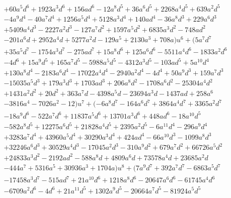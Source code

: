 \documentclass{gtpart}
\theoremstyle{definition}
\theoremstyle{remark}
\begin{document}
\begin{equation*}
\begin{split}
\qquad& + 60 a^5 d^6 + 1923 a^3 d^6 + 156 a d^6 - 12 a^8 d^5 + 36 a^6 d^5 + 2268 a^4 d^5 + 639 a^2 d^5 \\
      & - 4 a^9 d^4 - 40 a^7 d^4 + 1256 a^5 d^4 + 5128 a^3 d^4 + 140 a d^4 - 36 a^8 d^3 + 229 a^6 d^3 \\
      & + 5409 a^4 d^3 - 2227 a^2 d^3 - 127 a^7 d^2 + 1597 a^5 d^2 + 6835 a^3 d^2 - 748 a d^2 \\
      & - 201 a^6 d + 2952 a^4 d + 5277 a^2 d - 129 a^5 + 2130 a^3 + 708 a) u^6 + (5 a^7 d^7 \\
      & + 35 a^5 d^7 - 1754 a^3 d^7 - 275 a d^7 + 15 a^8 d^6 + 125 a^6 d^6 - 5511 a^4 d^6 - 1833 a^2 d^6 \\
      & - 4 d^6 + 15 a^9 d^5 + 165 a^7 d^5 - 5988 a^5 d^5 - 4312 a^3 d^5 - 103 a d^5 + 5 a^{10} d^4 \\
      & + 130 a^8 d^4 - 2183 a^6 d^4 - 17022 a^4 d^4 - 2940 a^2 d^4 - 4 d^4 + 50 a^9 d^3 + 159 a^7 d^3 \\
      & - 15035 a^5 d^3 + 179 a^3 d^3 + 1703 a d^3 + 206 a^8 d^2 - 1708 a^6 d^2 - 25304 a^4 d^2 \\
      & + 1431 a^2 d^2 + 20 d^2 + 363 a^7 d - 4398 a^5 d - 23694 a^3 d - 1437 a d + 258 a^6 \\
      & - 3816 a^4 - 7026 a^2 - 12) u^7 + (-6 a^8 d^7 - 164 a^6 d^7 + 3864 a^4 d^7 + 3365 a^2 d^7 \\
      & - 18 a^9 d^6 - 522 a^7 d^6 + 11837 a^5 d^6 + 13701 a^3 d^6 + 448 a d^6 - 18 a^{10} d^5 \\
      & - 582 a^8 d^5 + 12275 a^6 d^5 + 21828 a^4 d^5 + 2395 a^2 d^5 - 6 a^{11} d^4 - 296 a^9 d^4 \\
      & + 3283 a^7 d^4 + 43960 a^5 d^4 + 30290 a^3 d^4 + 424 a d^4 - 66 a^{10} d^3 - 1099 a^8 d^3 \\
      & + 32246 a^6 d^3 + 30529 a^4 d^3 - 17045 a^2 d^3 - 310 a^9 d^2 + 679 a^7 d^2 + 66726 a^5 d^2 \\
      & + 24833 a^3 d^2 - 2192 a d^2 - 588 a^8 d + 4809 a^6 d + 73578 a^4 d + 23685 a^2 d \\
      & - 444 a^7 + 5316 a^5 + 30936 a^3 + 1704 a) u^8 + (7 a^9 d^7 + 392 a^7 d^7 - 6863 a^5 d^7 \\
      & - 17458 a^3 d^7 - 515 a d^7 + 21 a^{10} d^6 + 1218 a^8 d^6 - 20647 a^6 d^6 - 61745 a^4 d^6 \\
      & - 6709 a^2 d^6 - 4 d^6 + 21 a^{11} d^5 + 1302 a^9 d^5 - 20664 a^7 d^5 - 81924 a^5 d^5 \\

\end{split}
\end{equation*}
\end{document}
